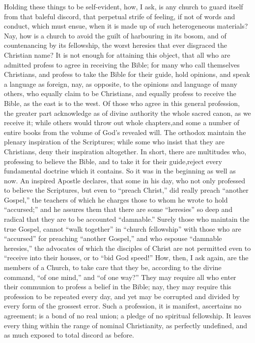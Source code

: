 \documentclass[
]{book}
\begin{document}
Holding these things to be self-evident, how, I ask, is any church to guard itself from that baleful discord, that perpetual strife of feeling, if not of words and conduct, which must ensue, when it is made up of such heterogeneous materials? Nay, how is a church to avoid the guilt of harbouring in its bosom, and of countenancing by its fellowship, the worst heresies that ever disgraced the Christian name? It is not enough for attaining this object, that all who are admitted profess to agree in receiving the Bible; for many who call themselves Christians, and profess to take the Bible for their guide, hold opinions, and speak a language as foreign, nay, as opposite, to the opinions and language of many others, who equally claim to be Christians, and equally profess to receive the Bible, as the east is to the west. Of those who agree in this general profession, the greater part acknowledge as of divine authority the whole sacred canon, as we receive it; while others would throw out whole chapters,and some a number of entire books from the volume of God's revealed will. The orthodox maintain the plenary inspiration of the Scriptures; while some who insist that they are Christians, deny their inspiration altogether. In short, there are multitudes who, professing to believe the Bible, and to take it for their guide,reject every fundamental doctrine which it contains. So it was in the beginning as well as now. An inspired Apostle declares, that some in his day, who not only professed to believe the Scriptures, but even to ``preach Christ,'' did really preach ``another Gospel,'' the teachers of which he charges those to whom he wrote to hold ``accursed;'' and he assures them that there are some ``heresies'' so deep and radical that they are to be accounted ``damnable.'' Surely those who maintain the true Gospel, cannot ``walk together'' in ``church fellowship'' with those who are ``accursed'' for preaching ``another Gospel,'' and who espouse ``damnable heresies,'' the advocates of which the disciples of Christ are not permitted even to ``receive into their houses, or to ``bid God speed!'' How, then, I ask again, are the members of a Church, to take care that they be, according to the divine command, ``of one mind,'' and ``of one way?'' They may require all who enter their communion to profess a belief in the Bible; nay, they may require this profession to be repeated every day, and yet may be corrupted and divided by every form of the grossest error. Such a profession, it is manifest, ascertains no agreement; is a bond of no real union; a pledge of no spiritual fellowship. It leaves every thing within the range of nominal Christianity, as perfectly undefined, and as much exposed to total discord as before.
\end{document}
